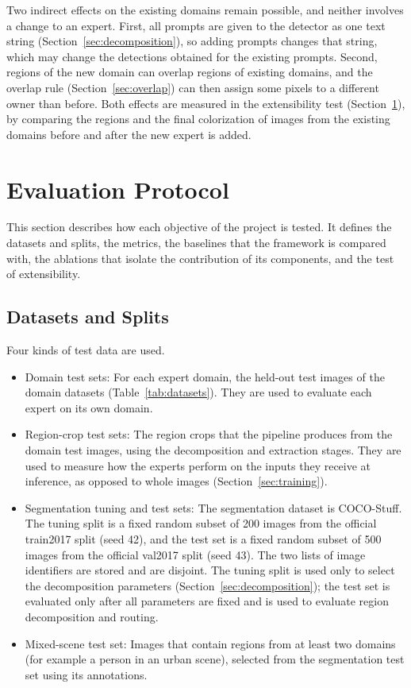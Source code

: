 \documentclass{FastFyp}
\begin{document}
Two indirect effects on the existing domains remain possible, and neither involves a change to an expert. First, all prompts are given to the detector as one text string (Section~\ref{sec:decomposition}), so adding prompts changes that string, which may change the detections obtained for the existing prompts. Second, regions of the new domain can overlap regions of existing domains, and the overlap rule (Section~\ref{sec:overlap}) can then assign some pixels to a different owner than before. Both effects are measured in the extensibility test (Section~\ref{sec:evaluation}), by comparing the regions and the final colorization of images from the existing domains before and after the new expert is added.

\newcommand{\newdomain}{[new domain]}

\section{Evaluation Protocol}
\label{sec:evaluation}

This section describes how each objective of the project is tested. It defines the datasets and splits, the metrics, the baselines that the framework is compared with, the ablations that isolate the contribution of its components, and the test of extensibility.

\subsection{Datasets and Splits}

Four kinds of test data are used.

\begin{itemize}
    \item Domain test sets: For each expert domain, the held-out test images of the domain datasets (Table~\ref{tab:datasets}). They are used to evaluate each expert on its own domain.
    \item Region-crop test sets: The region crops that the pipeline produces from the domain test images, using the decomposition and extraction stages. They are used to measure how the experts perform on the inputs they receive at inference, as opposed to whole images (Section~\ref{sec:training}).
    \item Segmentation tuning and test sets: The segmentation dataset is COCO-Stuff. The tuning split is a fixed random subset of 200 images from the official train2017 split (seed 42), and the test set is a fixed random subset of 500 images from the official val2017 split (seed 43). The two lists of image identifiers are stored and are disjoint. The tuning split is used only to select the decomposition parameters (Section~\ref{sec:decomposition}); the test set is evaluated only after all parameters are fixed and is used to evaluate region decomposition and routing.
    \item Mixed-scene test set: Images that contain regions from at least two domains (for example a person in an urban scene), selected from the segmentation test set using its annotations.
\end{itemize}
\end{document}
